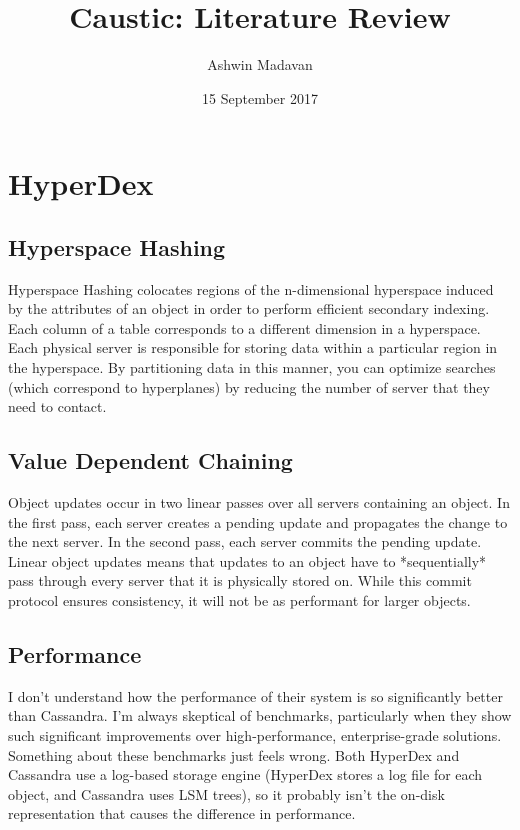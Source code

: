 \documentclass[journal]{../styles/IEEEtran}
\begin{document}
\title{Caustic: Literature Review}
\author{Ashwin Madavan}
\date{15 September 2017}
\maketitle

\section{HyperDex}

  \subsection{Hyperspace Hashing}
  Hyperspace Hashing colocates regions of the n-dimensional hyperspace induced by the attributes of 
  an object in order to perform efficient secondary indexing. Each column of a table corresponds to 
  a different dimension in a hyperspace. Each physical server is responsible for storing data within 
  a particular region in the hyperspace. By partitioning data in this manner, you can optimize 
  searches (which correspond to hyperplanes) by reducing the number of server that they need to 
  contact.

  \subsection{Value Dependent Chaining}
  Object updates occur in two linear passes over all servers containing an object. In the first 
  pass, each server creates a pending update and propagates the change to the next server. In the 
  second pass, each server commits the pending update. Linear object updates means that updates to 
  an object have to *sequentially* pass through every server that it is physically stored on. While 
  this commit protocol ensures consistency, it will not be as performant for larger objects.

  \subsection{Performance}
  I don't understand how the performance of their system is so significantly better than Cassandra. 
  I'm always skeptical of benchmarks, particularly when they show such significant improvements over 
  high-performance, enterprise-grade solutions. Something about these benchmarks just feels wrong. 
  Both HyperDex and Cassandra use a log-based storage engine (HyperDex stores a log file for each 
  object, and Cassandra uses LSM trees), so it probably isn't the on-disk representation that causes 
  the difference in performance.
\end{document}
